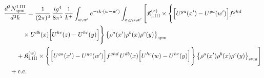 \begingroup\small
\begin{align}\label{eq:H-I.III-3}
&\frac{d^{3}N^{\rm I.III}_{{\rm sym}}}{d^{3}k}=\frac{1}{(2\pi)^{3}}\, \frac{ig^{4}}{8\pi^{5}}\, \frac{1}{k^{+}} \int_{w,w'}e^{-ik\cdot(w-w')} \int_{x,y,z,x'}\Bigg[ \mathfrak{K}^{(z)}_{\rm I.III} \times \Bigg\{\Big[U^{ga}(x')-U^{ga}(w')\Big]f^{ghd}\notag\\
&\quad\quad\quad \times U^{db}(x)\Big[U^{hc}(z)-U^{hc}(y)\Big]\Bigg\}\, \big\{\rho^{a}(x')\rho^{b}(x)\rho^{c}(y)\big\}_{\rm sym}\notag\\
&\quad\quad + \mathfrak{K}^{(w)}_{\rm I.III} \times \Bigg\{\Big[U^{ga}(x')-U^{ga}(w')\Big]f^{ghd}\, U^{db}(x)\Big[U^{hc}(w)-U^{hc}(y)\Big]\Bigg\}\, \big\{\rho^{a}(x')\rho^{b}(x)\rho^{c}(y)\big\}_{\rm sym}\Bigg]\notag\\
&\quad +{\rm c.c.}
\end{align}
\endgroup
